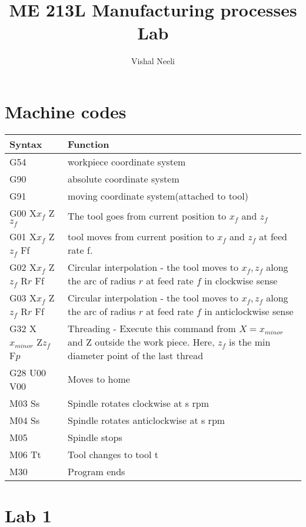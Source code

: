 \documentclass{article}
\title{ME 213L Manufacturing processes Lab}
\author{Vishal Neeli}
\begin{document}
\maketitle

\section{Machine codes}
\begin{tabular}{|m{12em}|m{30em}|}
	\hline
	\textbf{Syntax} & \textbf{Function}\\
	\hline
	\hline
	G54 & workpiece coordinate system\\
	\hline
	G90 & absolute coordinate system\\
	\hline
	G91 & moving coordinate system(attached to tool)\\
	\hline
	G00 X$x_f$ Z$z_f$ & The tool goes from current position to $x_f$ and $z_f$\\
	\hline
	G01 X$x_f$ Z$z_f$ Ff & tool moves from current position to $x_f$ and $z_f$ at feed rate f.\\
	\hline
	G02 X$x_f$ Z$z_f$ R$r$ Ff & Circular interpolation - the tool moves to $x_f,z_f$ along the arc of radius $r$ at feed rate $f$ in clockwise sense\\
	\hline
	G03 X$x_f$ Z$z_f$ R$r$ Ff & Circular interpolation - the tool moves to $x_f,z_f$ along the arc of radius $r$ at feed rate $f$ in anticlockwise sense\\
	\hline
	G32 X$x_{minor}$ Z$z_f$ F$p$ & Threading - Execute this command from $X=x_{minor}$ and Z outside the work piece. Here, $z_f$ is the min diameter point of the last thread\\
	\hline
	G28 U00 V00 & Moves to home \\%
	\hline
	M03 Ss & Spindle rotates clockwise at s rpm\\
	\hline
	M04 Ss & Spindle rotates anticlockwise at s rpm\\
	M05 & Spindle stops\\
	\hline
	M06 Tt & Tool changes to tool t\\
	\hline
	M30 & Program ends\\
	\hline
	
\end{tabular}


\section{Lab 1}
\end{document}

